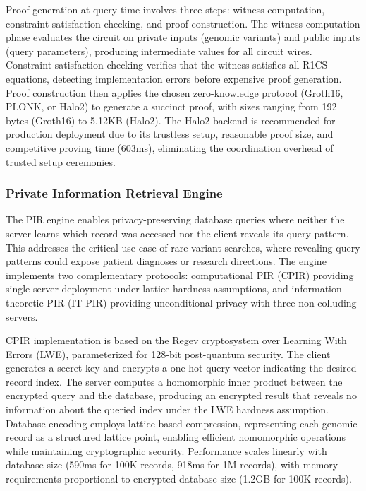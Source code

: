 \documentclass[11pt,letterpaper]{article}
\begin{document}
Proof generation at query time involves three steps: witness computation, constraint satisfaction checking, and proof construction. The witness computation phase evaluates the circuit on private inputs (genomic variants) and public inputs (query parameters), producing intermediate values for all circuit wires. Constraint satisfaction checking verifies that the witness satisfies all R1CS equations, detecting implementation errors before expensive proof generation. Proof construction then applies the chosen zero-knowledge protocol (Groth16, PLONK, or Halo2) to generate a succinct proof, with sizes ranging from 192 bytes (Groth16) to 5.12KB (Halo2). The Halo2 backend is recommended for production deployment due to its trustless setup, reasonable proof size, and competitive proving time (603ms), eliminating the coordination overhead of trusted setup ceremonies.

\subsubsection{Private Information Retrieval Engine}

The PIR engine enables privacy-preserving database queries where neither the server learns which record was accessed nor the client reveals its query pattern. This addresses the critical use case of rare variant searches, where revealing query patterns could expose patient diagnoses or research directions. The engine implements two complementary protocols: computational PIR (CPIR) providing single-server deployment under lattice hardness assumptions, and information-theoretic PIR (IT-PIR) providing unconditional privacy with three non-colluding servers.

CPIR implementation is based on the Regev cryptosystem over Learning With Errors (LWE), parameterized for 128-bit post-quantum security. The client generates a secret key and encrypts a one-hot query vector indicating the desired record index. The server computes a homomorphic inner product between the encrypted query and the database, producing an encrypted result that reveals no information about the queried index under the LWE hardness assumption. Database encoding employs lattice-based compression, representing each genomic record as a structured lattice point, enabling efficient homomorphic operations while maintaining cryptographic security. Performance scales linearly with database size (590ms for 100K records, 918ms for 1M records), with memory requirements proportional to encrypted database size (1.2GB for 100K records).
\end{document}
